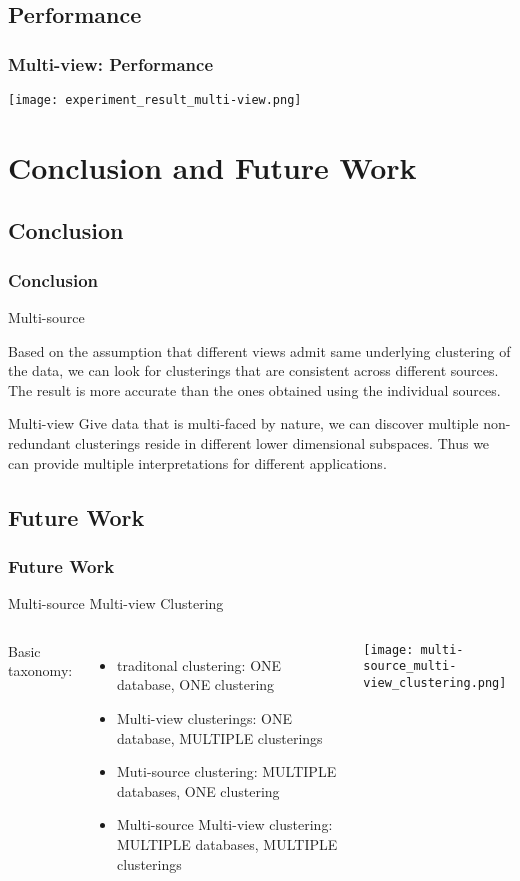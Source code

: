 \documentclass{beamer}
\begin{document}
\subsection{Performance}
\begin{frame}
\frametitle{Multi-view: Performance}
\texttt{[image: experiment\_result\_multi-view.png]}
\end{frame}

\section{Conclusion and Future Work}
\subsection{Conclusion}
\begin{frame}
\frametitle{Conclusion}
	\begin{block}{Multi-source}
	\end{block}
	Based on the assumption that different views admit same underlying clustering of the data, we can look for clusterings that are consistent across different sources. The result is more accurate than the ones obtained using the individual sources.
	\begin{exampleblock}{Multi-view}
	Give data that is multi-faced by nature, we can discover multiple non-redundant clusterings reside in different lower dimensional subspaces. Thus we can provide multiple interpretations for different applications.
	\end{exampleblock}
\end{frame}

\subsection{Future Work}
\begin{frame}
\frametitle{Future Work}
\begin{block}{Multi-source Multi-view Clustering}
	\begin{columns}
		Basic taxonomy:\\
		\begin{itemize}
			\item{traditonal clustering: ONE database, ONE clustering}
			\item{Multi-view clusterings: ONE database, MULTIPLE clusterings}
			\item{Muti-source clustering: MULTIPLE databases, ONE clustering}
			\item{Multi-source Multi-view clustering: MULTIPLE databases, MULTIPLE clusterings}
		\end{itemize}
		\texttt{[image: multi-source\_multi-view\_clustering.png]}
	\end{columns}
\end{block}
\end{frame}
\end{document}
